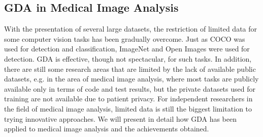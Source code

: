 \documentclass[preprint,12pt,authoryear]{elsarticle}
\begin{document}
\subsection{GDA in Medical Image Analysis}
With the presentation of several large datasets, the restriction of limited data for some computer vision tasks has been gradually overcome. Just as COCO was used for detection and classification, ImageNet and Open Images were used for detection. GDA is effective, though not spectacular, for such tasks. In addition, there are still some research areas that are limited by the lack of available public datasets, e.g. in the area of medical image analysis, where most tasks are publicly available only in terms of code and test results, but the private datasets used for training are not available due to patient privacy. For independent researchers in the field of medical image analysis, limited data is still the biggest limitation to trying innovative approaches. We will present in detail how GDA has been applied to medical image analysis and the achievements obtained.
\end{document}
